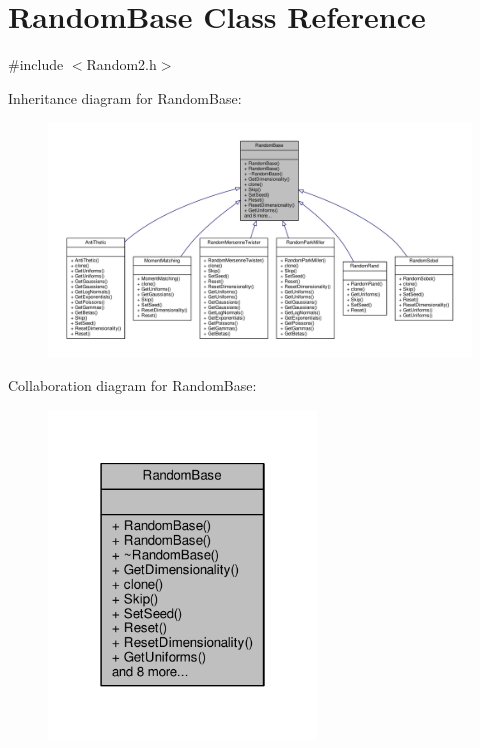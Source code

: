 \hypertarget{classRandomBase}{}\section{Random\+Base Class Reference}
\label{classRandomBase}


{\ttfamily \#include $<$Random2.\+h$>$}



Inheritance diagram for Random\+Base\+:
\nopagebreak
\begin{figure}[H]
\begin{center}
\leavevmode
\includegraphics[width=350pt]{classRandomBase__inherit__graph}
\end{center}
\end{figure}


Collaboration diagram for Random\+Base\+:
\nopagebreak
\begin{figure}[H]
\begin{center}
\leavevmode
\includegraphics[width=202pt]{classRandomBase__coll__graph}
\end{center}
\end{figure}
